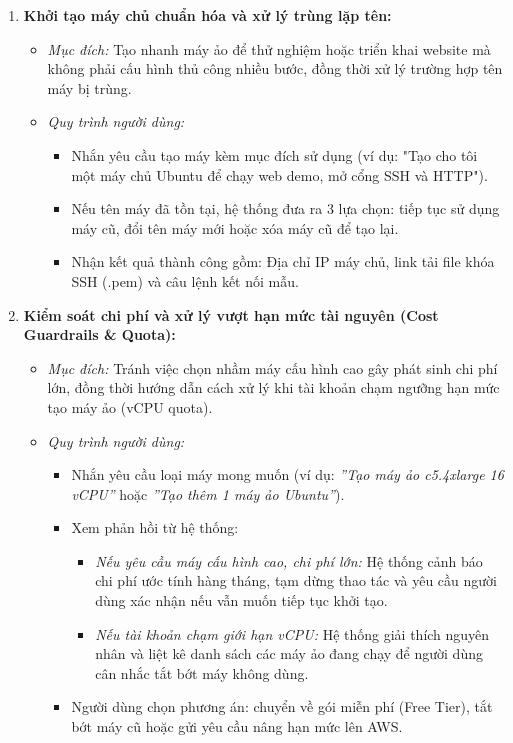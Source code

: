 \documentclass[a4paper,12pt]{article}
\begin{document}
\begin{enumerate}
  \item \textbf{Khởi tạo máy chủ chuẩn hóa và xử lý trùng lặp tên:}
  \begin{itemize}
    \item \textit{Mục đích:} Tạo nhanh máy ảo để thử nghiệm hoặc triển khai website mà không phải cấu hình thủ công nhiều bước, đồng thời xử lý trường hợp tên máy bị trùng.
    \item \textit{Quy trình người dùng:} 
    \begin{itemize}
      \item Nhắn yêu cầu tạo máy kèm mục đích sử dụng (ví dụ: "Tạo cho tôi một máy chủ Ubuntu để chạy web demo, mở cổng SSH và HTTP").
      \item Nếu tên máy đã tồn tại, hệ thống đưa ra 3 lựa chọn: tiếp tục sử dụng máy cũ, đổi tên máy mới hoặc xóa máy cũ để tạo lại.
      \item Nhận kết quả thành công gồm: Địa chỉ IP máy chủ, link tải file khóa SSH (.pem) và câu lệnh kết nối mẫu.
    \end{itemize}
  \end{itemize}

  \item \textbf{Kiểm soát chi phí và xử lý vượt hạn mức tài nguyên (Cost Guardrails \& Quota):}
  \begin{itemize}
    \item \textit{Mục đích:} Tránh việc chọn nhầm máy cấu hình cao gây phát sinh chi phí lớn, đồng thời hướng dẫn cách xử lý khi tài khoản chạm ngưỡng hạn mức tạo máy ảo (vCPU quota).
    \item \textit{Quy trình người dùng:}
    \begin{itemize}
      \item Nhắn yêu cầu loại máy mong muốn (ví dụ: \textit{''Tạo máy ảo c5.4xlarge 16 vCPU''} hoặc \textit{''Tạo thêm 1 máy ảo Ubuntu''}).
      \item Xem phản hồi từ hệ thống:
      \begin{itemize}
        \item \textit{Nếu yêu cầu máy cấu hình cao, chi phí lớn:} Hệ thống cảnh báo chi phí ước tính hàng tháng, tạm dừng thao tác và yêu cầu người dùng xác nhận nếu vẫn muốn tiếp tục khởi tạo.
        \item \textit{Nếu tài khoản chạm giới hạn vCPU:} Hệ thống giải thích nguyên nhân và liệt kê danh sách các máy ảo đang chạy để người dùng cân nhắc tắt bớt máy không dùng.
      \end{itemize}
      \item Người dùng chọn phương án: chuyển về gói miễn phí (Free Tier), tắt bớt máy cũ hoặc gửi yêu cầu nâng hạn mức lên AWS.
    \end{itemize}
  \end{itemize}


\end{enumerate}
\end{document}
